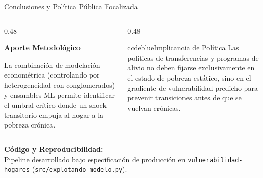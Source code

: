 \documentclass[aspectratio=169,11pt,table]{beamer}
\begin{document}
\begin{frame}{Conclusiones y Política Pública Focalizada}
\begin{columns}[T,onlytextwidth]
\begin{column}{0.48\textwidth}
\begin{keybox}
\textbf{Aporte Metodológico}\par\vspace{0.08cm}
La combinación de modelación econométrica (controlando por heterogeneidad con conglomerados) y ensambles ML permite identificar el umbral crítico donde un shock transitorio empuja al hogar a la pobreza crónica.
\end{keybox}
\end{column}
\begin{column}{0.48\textwidth}
\begin{contrastbox}{ccdeblue}{Implicancia de Política}
Las políticas de transferencias y programas de alivio no deben fijarse exclusivamente en el estado de pobreza estático, sino en el gradiente de vulnerabilidad predicho para prevenir transiciones antes de que se vuelvan crónicas.
\end{contrastbox}
\end{column}
\end{columns}
\vspace{0.25cm}
\begin{ccdebox}
\small
\textbf{Código y Reproducibilidad:}\\
Pipeline desarrollado bajo especificación de producción en \texttt{vulnerabilidad-hogares} (\texttt{src/explotando\_modelo.py}).
\end{ccdebox}
\end{frame}
\end{document}
